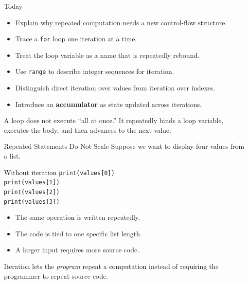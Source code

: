 \documentclass[aspectratio=169,10pt]{beamer}
\begin{document}
\makedecktitle

\begin{frame}{Today}
  \begin{itemize}
    \item Explain why repeated computation needs a new control-flow structure.
    \item Trace a \texttt{for} loop one iteration at a time.
    \item Treat the loop variable as a name that is repeatedly rebound.
    \item Use \texttt{range} to describe integer sequences for iteration.
    \item Distinguish direct iteration over values from iteration over indexes.
    \item Introduce an \textbf{accumulator} as state updated across iterations.
  \end{itemize}

  \begin{keyidea}
    A loop does not execute ``all at once.'' It repeatedly binds a loop variable, executes the body, and then advances to the next value.
  \end{keyidea}
\end{frame}


\begin{frame}{Repeated Statements Do Not Scale}
  Suppose we want to display four values from a list.

  \begin{block}{Without iteration}
    \texttt{print(values[0])}\\
    \texttt{print(values[1])}\\
    \texttt{print(values[2])}\\
    \texttt{print(values[3])}
  \end{block}

  \begin{itemize}
    \item The same operation is written repeatedly.
    \item The code is tied to one specific list length.
    \item A larger input requires more source code.
  \end{itemize}

  \begin{keyidea}
    Iteration lets the \emph{program} repeat a computation instead of requiring the programmer to repeat source code.
  \end{keyidea}
\end{frame}
\end{document}

